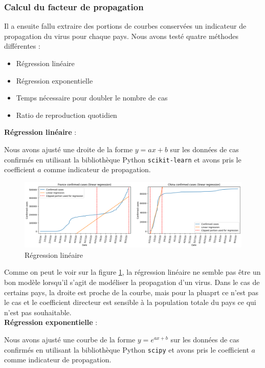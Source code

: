 \documentclass[12pt]{iEEEtran}
\begin{document}
\subsubsection{Calcul du facteur de propagation}
Il a ensuite fallu extraire des portions de courbes conservées un indicateur de propagation du virus
pour chaque pays. Nous avons testé quatre méthodes différentes :
\begin{itemize}
    \item Régression linéaire
    \item Régression exponentielle
    \item Temps nécessaire pour doubler le nombre de cas
    \item Ratio de reproduction quotidien
\end{itemize}

\noindent\textbf{Régression linéaire} : 

Nous avons ajusté une droite de la forme $y = ax + b$ sur les données de cas confirmés en utilisant
la bibliothèque Python \texttt{scikit-learn} et avons pris le coefficient $a$ comme indicateur de
propagation.

\begin{figure}[h]
    \centering
    \includegraphics[width=\columnwidth]{img/lin_reg.png}
    \caption{Régression linéaire}

    \label{fig:lin_reg}
\end{figure}

Comme on peut le voir sur la figure \ref{fig:lin_reg}, la régression linéaire ne semble pas être un
bon modèle lorsqu'il s'agit de modéliser la propagation d'un virus. Dans le cas de certains pays, la
droite est proche de la courbe, mais pour la pluaprt ce n'est pas le cas et le coefficient directeur
est sensible à la population totale du pays ce qui n'est pas souhaitable.
\\

\noindent\textbf{Régression exponentielle} :

Nous avons ajusté une courbe de la forme $y = e^{ax+b}$ sur les données de cas confirmés en utilisant
la bibliothèque Python \texttt{scipy} et avons pris le coefficient $a$ comme indicateur de propagation.
\end{document}
